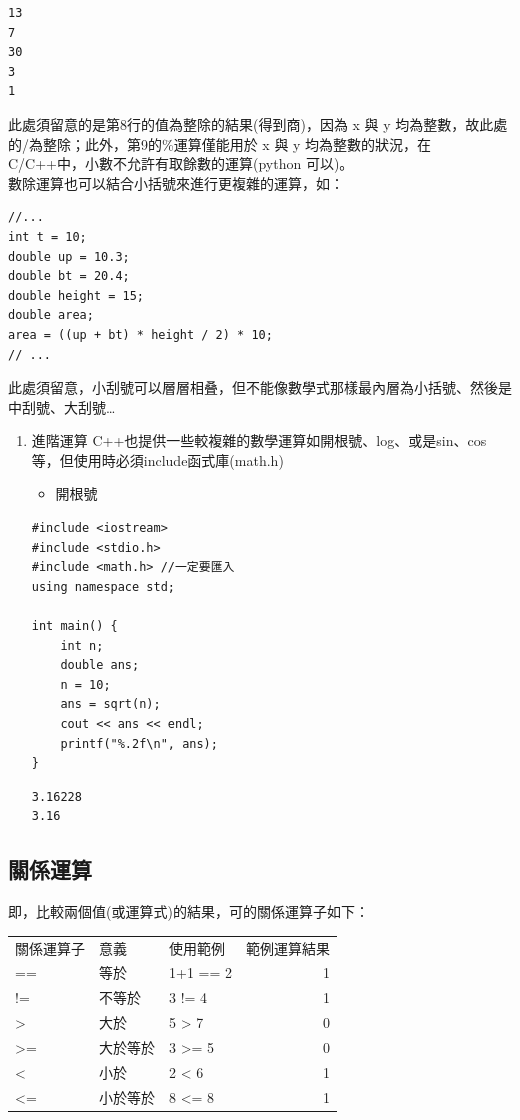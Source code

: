 \documentclass[a4paper,12pt]{article}
\begin{document}
\begin{verbatim}
13
7
30
3
1
\end{verbatim}


此處須留意的是第8行的值為整除的結果(得到商)，因為 x 與 y 均為整數，故此處的/為整除；此外，第9的\%運算僅能用於 x 與 y 均為整數的狀況，在 C/C++中，小數不允許有取餘數的運算(python 可以)。\\

數除運算也可以結合小括號來進行更複雜的運算，如：\\
\lstset{breaklines=true,language=cpp,label= ,caption= ,captionpos=b,firstnumber=1,numbers=left}
\begin{lstlisting}
//...
int t = 10;
double up = 10.3;
double bt = 20.4;
double height = 15;
double area;
area = ((up + bt) * height / 2) * 10;
// ...
\end{lstlisting}

此處須留意，小刮號可以層層相叠，但不能像數學式那樣最內層為小括號、然後是中刮號、大刮號\ldots{}\\

\begin{enumerate}
\item 進階運算
\label{sec:orgfd9cfd6}
C++也提供一些較複雜的數學運算如開根號、log、或是sin、cos等，但使用時必須include函式庫(math.h)\\
\begin{itemize}
\item 開根號\\
\end{itemize}
\lstset{breaklines=true,language=cpp,label= ,caption= ,captionpos=b,firstnumber=1,numbers=left}
\begin{lstlisting}
#include <iostream>
#include <stdio.h>
#include <math.h> //一定要匯入
using namespace std;

int main() {
    int n;
    double ans;
    n = 10;
    ans = sqrt(n);
    cout << ans << endl;
    printf("%.2f\n", ans);
}
\end{lstlisting}

\begin{verbatim}
3.16228
3.16
\end{verbatim}
\end{enumerate}

\subsection{關係運算}
\label{cpp_cond_operation}
即，比較兩個值(或運算式)的結果，可的關係運算子如下：\\
\begin{center}
\begin{tabular}{lllr}
關係運算子 & 意義 & 使用範例 & 範例運算結果\\
== & 等於 & 1+1 == 2 & 1\\
!= & 不等於 & 3 != 4 & 1\\
> & 大於 & 5 > 7 & 0\\
>= & 大於等於 & 3 >= 5 & 0\\
< & 小於 & 2 < 6 & 1\\
<= & 小於等於 & 8 <= 8 & 1\\
\end{tabular}
\end{center}
\end{document}
